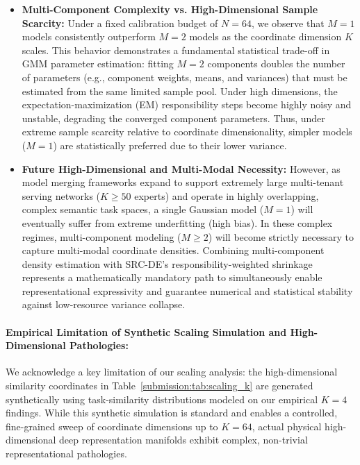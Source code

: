 \begin{itemize}
    To successfully scale the Global Coordinate-Wise Diagonal target to high-dimensional settings with non-uniform backgrounds (where different similarity coordinates exhibit disparate variance scales), future work could integrate hierarchical Bayesian priors or parameter-pooling strategies across registered tasks to pool global variance estimates. By sharing statistical strength across tasks or calibration sessions, the sampling variance of the coordinate-specific global variances can be drastically reduced, preserving coordinate scale integrity in high dimensions without introducing estimation instability.
    \item {\bf Multi-Component Complexity vs. High-Dimensional Sample Scarcity:} Under a fixed calibration budget of $N=64$, we observe that $M=1$ models consistently outperform $M=2$ models as the coordinate dimension $K$ scales. This behavior demonstrates a fundamental statistical trade-off in GMM parameter estimation: fitting $M=2$ components doubles the number of parameters (e.g., component weights, means, and variances) that must be estimated from the same limited sample pool. Under high dimensions, the expectation-maximization (EM) responsibility steps become highly noisy and unstable, degrading the converged component parameters. Thus, under extreme sample scarcity relative to coordinate dimensionality, simpler models ($M=1$) are statistically preferred due to their lower variance.
    \item {\bf Future High-Dimensional and Multi-Modal Necessity:} However, as model merging frameworks expand to support extremely large multi-tenant serving networks ($K \ge 50$ experts) and operate in highly overlapping, complex semantic task spaces, a single Gaussian model ($M=1$) will eventually suffer from extreme underfitting (high bias). In these complex regimes, multi-component modeling ($M \ge 2$) will become strictly necessary to capture multi-modal coordinate densities. Combining multi-component density estimation with SRC-DE's responsibility-weighted shrinkage represents a mathematically mandatory path to simultaneously enable representational expressivity and guarantee numerical and statistical stability against low-resource variance collapse.
\end{itemize}

\paragraph{Empirical Limitation of Synthetic Scaling Simulation and High-Dimensional Pathologies:} We acknowledge a key limitation of our scaling analysis: the high-dimensional similarity coordinates in Table~\ref{submission:tab:scaling_k} are generated synthetically using task-similarity distributions modeled on our empirical $K=4$ findings. While this synthetic simulation is standard and enables a controlled, fine-grained sweep of coordinate dimensions up to $K=64$, actual physical high-dimensional deep representation manifolds exhibit complex, non-trivial representational pathologies. 

